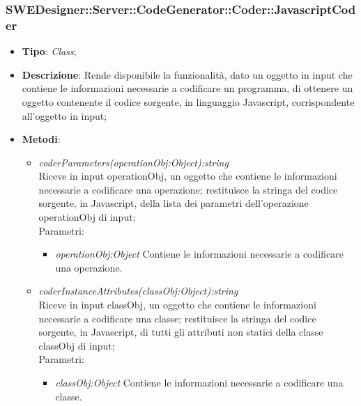 \documentclass[../DefinizioneDiProdotto.tex]{subfiles}
\begin{document}
			\subsubsection{SWEDesigner::Server::CodeGenerator::Coder::JavascriptCoder}
			\hypertarget{SWEDesigner::Server::CodeGenerator::Coder::JavascriptCoder}{}
			\begin{itemize}
				\item \textbf{Tipo}: \emph{Class};
				\item \textbf{Descrizione}: Rende disponibile la funzionalità, dato un oggetto in input che contiene le informazioni necessarie a codificare un programma, di ottenere un oggetto contenente il codice sorgente, in linguaggio Javascript, corrispondente all'oggetto in input;\\
				\item \textbf{Metodi}:
				\begin{itemize}
					\item \emph{coderParameters(operationObj:Object):string} \\ 
					Riceve in input operationObj, un oggetto che contiene le informazioni necessarie a codificare una operazione; 
					restituisce la stringa del codice sorgente, in Javascript, della lista dei parametri dell'operazione operationObj di input; \\
					Parametri:
					\begin{itemize}
						\item \emph{operationObj:Object} Contiene le informazioni necessarie a codificare una operazione.
					\end{itemize}
					
					\item \emph{coderInstanceAttributes(classObj:Object):string} \\ 
					Riceve in input classObj, un oggetto che contiene le informazioni necessarie a codificare una classe; 
					restituisce la stringa del codice sorgente, in Javascript, di tutti gli attributi non statici della classe classObj di input; \\
					Parametri:
					\begin{itemize}
						\item \emph{classObj:Object} Contiene le informazioni necessarie a codificare una classe.
					\end{itemize}
					

\end{itemize}
\end{itemize}
\end{document}
